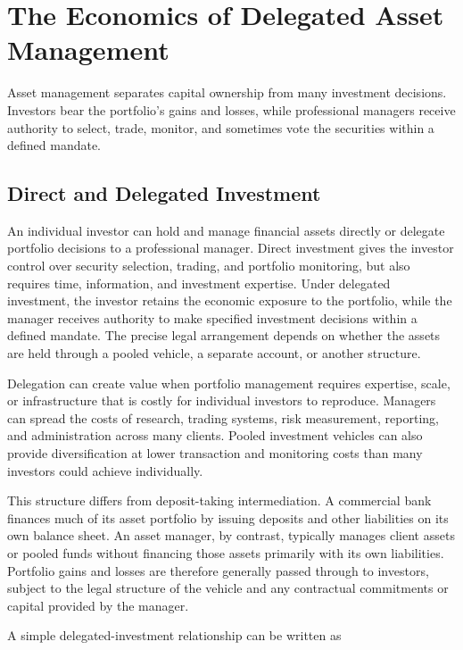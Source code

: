 \section{The Economics of Delegated Asset Management}

Asset management separates capital ownership from many investment decisions. Investors bear the portfolio's gains and losses, while professional managers receive authority to select, trade, monitor, and sometimes vote the securities within a defined mandate.

\subsection{Direct and Delegated Investment}

An individual investor can hold and manage financial assets directly or delegate portfolio decisions to a professional manager. Direct investment gives the investor control over security selection, trading, and portfolio monitoring, but also requires time, information, and investment expertise. Under delegated investment, the investor retains the economic exposure to the portfolio, while the manager receives authority to make specified investment decisions within a defined mandate. The precise legal arrangement depends on whether the assets are held through a pooled vehicle, a separate account, or another structure.

Delegation can create value when portfolio management requires expertise, scale, or infrastructure that is costly for individual investors to reproduce. Managers can spread the costs of research, trading systems, risk measurement, reporting, and administration across many clients. Pooled investment vehicles can also provide diversification at lower transaction and monitoring costs than many investors could achieve individually.

This structure differs from deposit-taking intermediation. A commercial bank finances much of its asset portfolio by issuing deposits and other liabilities on its own balance sheet. An asset manager, by contrast, typically manages client assets or pooled funds without financing those assets primarily with its own liabilities. Portfolio gains and losses are therefore generally passed through to investors, subject to the legal structure of the vehicle and any contractual commitments or capital provided by the manager.

A simple delegated-investment relationship can be written as

